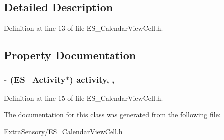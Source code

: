 \subsection{Detailed Description}


Definition at line 13 of file E\+S\+\_\+\+Calendar\+View\+Cell.\+h.



\subsection{Property Documentation}
\hypertarget{interface_e_s___calendar_view_cell_afdfb7a1cac0ee17928aa2634d89e8e8e}{
\subsubsection[{activity}]{\setlength{\rightskip}{0pt plus 5cm}-\/ ({\bf E\+S\+\_\+\+Activity}$\ast$) activity\hspace{0.3cm}{\ttfamily [read]}, {\ttfamily [write]}, {\ttfamily [atomic]}}}\label{interface_e_s___calendar_view_cell_afdfb7a1cac0ee17928aa2634d89e8e8e}


Definition at line 15 of file E\+S\+\_\+\+Calendar\+View\+Cell.\+h.



The documentation for this class was generated from the following file\+:\begin{DoxyCompactItemize}
\item 
Extra\+Sensory/\hyperlink{_e_s___calendar_view_cell_8h}{E\+S\+\_\+\+Calendar\+View\+Cell.\+h}\end{DoxyCompactItemize}
